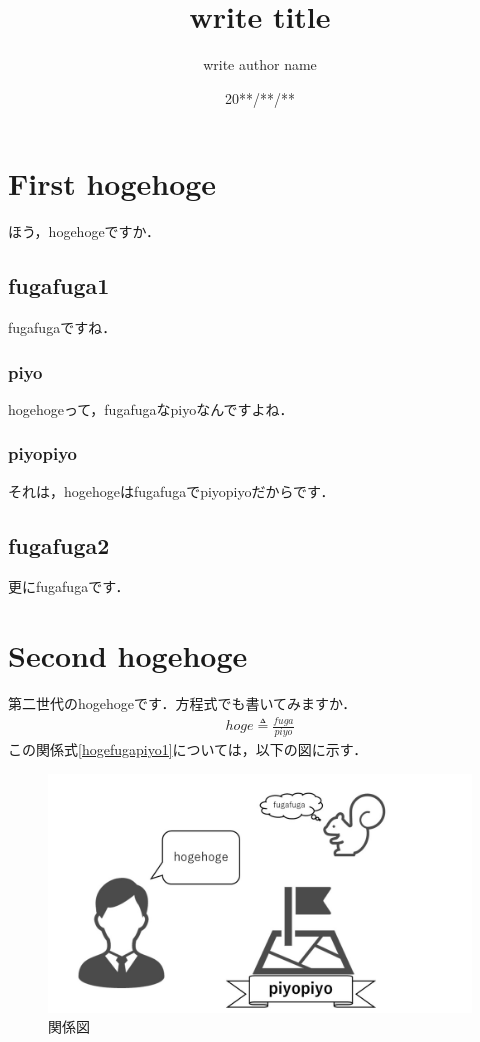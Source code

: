 \documentclass[11pt, a4paper, titlepage]{jsarticle} %
\title{write title}
\author{write author name}
\date{20**/**/**}
\begin{document}
\maketitle
\section{First hogehoge}
ほう，hogehogeですか．
\subsection{fugafuga1}
fugafugaですね．
\subsubsection{piyo}
hogehogeって，fugafugaなpiyoなんですよね．
\subsubsection{piyopiyo}
それは，hogehogeはfugafugaでpiyopiyoだからです．
\subsection{fugafuga2}
更にfugafugaです．
\section{Second hogehoge}
第二世代のhogehogeです．方程式でも書いてみますか．
\begin{align}
    \label{hogefugapiyo1}
    hoge \triangleq \frac{fuga}{piyo}
\end{align}
この関係式\ref{hogefugapiyo1}については，以下の図に示す．

\begin{figure}[htb]
    \centerline{\includegraphics[scale=0.3, clip]{hogefugapiyo.jpg}}
    \caption{関係図}
    \label{hogefugapiyo2}
    \end{figure}
\end{document}
